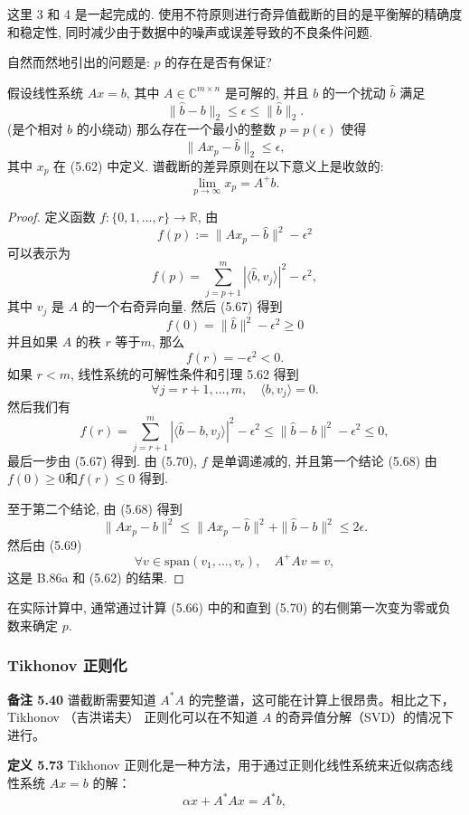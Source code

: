 \documentclass[a4paper]{ctexart}
\newcommand{\hl}[1]
{\noindent {\bf {#1}}}
\begin{document}
{这里 3 和 4 是一起完成的. 使用不符原则进行奇异值截断的目的是平衡解的精确度和稳定性, 
同时减少由于数据中的噪声或误差导致的不良条件问题. 


自然而然地引出的问题是: $p$ 的存在是否有保证? 

\hl{定理5.72} 假设线性系统 $Ax = b$, 其中 $A \in \mathbb{C}^{m \times n}$ 
是可解的, 并且 $b$ 的一个扰动 $\hat{b}$ 满足
\[ 
\|\hat{b} - b\|_2 \leq \epsilon \leq \|\hat{b}\|_2. 
\]
(是个相对 $b$ 的小绕动) 那么存在一个最小的整数 $p = p(\epsilon)$ 使得
\[ 
\|A x_p - \hat{b}\|_2 \leq \epsilon, 
\]
其中 $x_p$ 在 (5.62) 中定义. 谱截断的差异原则在以下意义上是收敛的:
\[ 
\lim_{p \to \infty} x_p = A^+ b. 
\]

\begin{proof}
定义函数 $f : \{0, 1, \ldots, r\} \rightarrow \mathbb{R}$, 
由
\[ 
f(p) := \|Ax_p - \hat{b}\|^2 - \epsilon^2 
\]
可以表示为
\[ 
f(p) = \sum_{j = p + 1}^{m} \left| \langle \hat{b}, v_j \rangle \right|^2 - \epsilon^2, 
\]
其中 $v_j$ 是 $A$ 的一个右奇异向量. 然后 (5.67) 得到
\[ 
f(0) = \|\hat{b}\|^2 - \epsilon^2 \geq 0 
\]
并且如果 $A$ 的秩 $r$ 等于$m$, 那么
\[ 
f(r) = -\epsilon^2 < 0. 
\]
如果 $r < m$, 线性系统的可解性条件和引理 5.62 得到
\[ 
\forall j = r + 1, \ldots, m, \quad \langle b, v_j \rangle = 0. 
\]
然后我们有
\[ 
f(r) = \sum_{j=r+1}^{m} \left| \langle \hat{b} - b, v_j \rangle \right|^2 - \epsilon^2 
\leq \|\hat{b} - b\|^2 - \epsilon^2 \leq 0, 
\]
最后一步由 (5.67) 得到. 由 (5.70), $f$ 是单调递减的, 
并且第一个结论 (5.68) 由 $f(0) \geq 0$和$f(r) \leq 0$ 得到. 

至于第二个结论, 由 (5.68) 得到
\[ 
\|Ax_p - b\|^2 \leq \|Ax_p - \hat{b}\|^2 + \|\hat{b} - b\|^2 \leq 2\epsilon. 
\]
然后由 (5.69)
\[ 
\forall v \in \text{span}(v_1, \ldots, v_r), \quad A^+Av = v, 
\]
这是 B.86a 和 (5.62) 的结果. 
\end{proof}

在实际计算中, 通常通过计算 (5.66) 中的和直到 (5.70) 的右侧第一次变为零或负数来确定 $p$. 

\subsubsection{Tikhonov 正则化}

\noindent \textbf{备注 5.40 } 谱截断需要知道 \(A^*A\) 的完整谱，这可能在计算上很昂贵。相比之下，
Tikhonov （吉洪诺夫） 正则化可以在不知道 \(A\) 的奇异值分解（SVD）的情况下进行。

\noindent \textbf{定义 5.73 } Tikhonov 正则化是一种方法，用于通过正则化线性系统来近似病态线性系统 \(Ax = b\) 的解：
\[
  \alpha x + A^*Ax = A^*b, \tag{5.71}
\]

}
\end{document}
